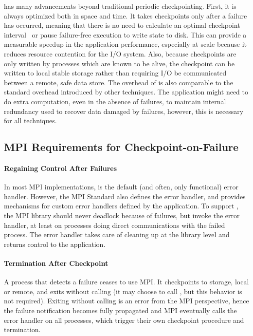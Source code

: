 
\cof has many advancements beyond traditional periodic checkpointing. First, it
is always optimized both in space and time. It takes checkpoints only after a
failure has occurred, meaning that there is no need to calculate an optimal
checkpoint interval~\cite{Daly:2006dy} or pause failure-free execution to write
state to disk. This can provide a measurable speedup in the application
performance, especially at scale because it reduces resource contention for the
I/O system. Also, because checkpoints are only written by processes which are
known to be alive, the checkpoint can be written to local stable storage rather
than requiring I/O be communicated between a remote, safe data store. The
overhead of \cof is also comparable to the standard overhead introduced by other
\abft techniques. The application might need to do extra computation, even in
the absence of failures, to maintain internal redundancy used to recover data
damaged by failures, however, this is necessary for all \abft techniques.


\subsection{MPI Requirements for Checkpoint-on-Failure}\label{sec:interface}

\paragraph*{Regaining Control After Failures} In most MPI implementations,
 is the default (and often, only functional) error
handler.  However, the MPI Standard also defines the error handler,
 and provides mechanisms for custom error handlers
defined by the application. To support \cof, the MPI library should never
deadlock because of failures, but invoke the error handler, at least on
processes doing direct communications with the failed process. The error handler
takes care of cleaning up at the library level and returns control to the
application.

\paragraph*{Termination After Checkpoint} A process that detects a failure
ceases to use MPI. It checkpoints to storage, local or remote, and exits without
calling  (it may choose to call
, but this behavior is not required). Exiting without
calling  is an error from the MPI perspective, hence the
failure notification becomes fully propagated and MPI eventually calls the error
handler on all processes, which trigger their own checkpoint procedure and
termination.

